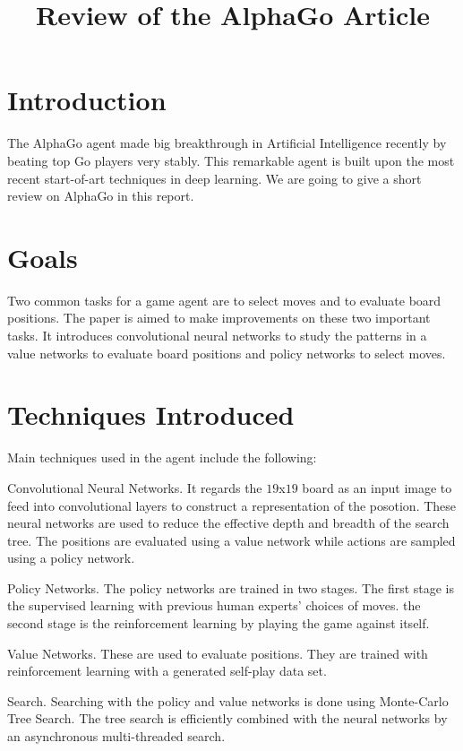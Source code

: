 \documentclass[11pt]{article} %
\title{Review of the AlphaGo Article}
\begin{document}
\maketitle

\section{Introduction}
The AlphaGo agent made big breakthrough in Artificial Intelligence recently by beating top Go players very stably. This remarkable agent is built upon the most recent start-of-art techniques in deep learning. We are going to give a short review on AlphaGo in this report.


\section{Goals}

Two common tasks for a game agent are to select moves and to evaluate board positions. The paper is aimed to make improvements on these two important tasks. It introduces convolutional neural networks to study the patterns in a value networks to evaluate board positions and policy networks to select moves.


\section{Techniques Introduced}

Main techniques used in the agent include the following:

Convolutional Neural Networks. It regards the $19$x$19$ board as an input image to feed into convolutional layers to construct a representation of the posotion. These neural networks are used to reduce the effective depth and breadth of the search tree. The positions are evaluated using a value network while actions are sampled using a policy network. 

Policy Networks. The policy networks are trained in two stages. The first stage is the supervised learning with previous human experts' choices of moves. the second stage is the reinforcement learning by playing the game against itself. 

Value Networks. These are used to evaluate positions. They are trained with reinforcement learning with a generated self-play data set.

Search. Searching with the policy and value networks is done using Monte-Carlo Tree Search. The tree search is efficiently combined with the neural networks by an asynchronous multi-threaded search.
\end{document}
